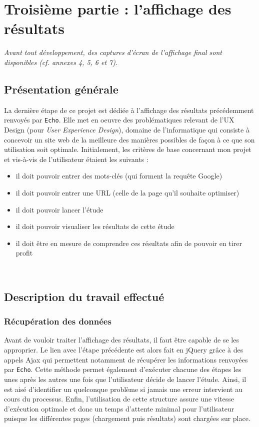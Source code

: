 \documentclass[12pt]{article}
\begin{document}

\newpage
\section{Troisième partie : l'affichage des résultats}

\textit{Avant tout développement, des captures d'écran de l'affichage final sont disponibles (cf. \textsl{annexes 4, 5, 6 et 7}).}

\subsection{Présentation générale}

La dernière étape de ce projet est dédiée à l'affichage des résultats précédemment renvoyés par \texttt{Echo}. Elle met en oeuvre des problématiques relevant de l'UX Design (pour \textit{User Experience Design}), domaine de l'informatique qui consiste à concevoir un site web de la meilleure des manières possibles de façon à ce que son utilisation soit optimale. Initialement, les critères de base concernant mon projet et vis-à-vis de l'utilisateur étaient les suivants : 
\begin{itemize}
	\item il doit pouvoir entrer des mots-clés (qui forment la requête Google)
	\item il doit pouvoir entrer une URL (celle de la page qu'il souhaite optimiser)
	\item il doit pouvoir lancer l'étude
	\item il doit pouvoir visualiser les résultats de cette étude
	\item il doit être en mesure de comprendre ces résultats afin de pouvoir en tirer profit
\end{itemize}

\

\subsection{Description du travail effectué}

\subsubsection{Récupération des données}

Avant de vouloir traiter l'affichage des résultats, il faut être capable de se les approprier. Le lien avec l'étape précédente est alors fait en \textsf{jQuery} grâce à des appels \textsf{Ajax} qui permettent notamment de récupérer les informations renvoyées par \texttt{Echo}. Cette méthode permet également d'exécuter chacune des étapes les unes après les autres une fois que l'utilisateur décide de lancer l'étude. Ainsi, il est aisé d'identifier un quelconque problème si jamais une erreur intervient au cours du processus. Enfin, l'utilisation de cette structure assure une vitesse d'exécution optimale et donc un temps d'attente minimal pour l'utilisateur puisque les différentes pages (chargement puis résultats) sont chargées sur place. 
\end{document}
